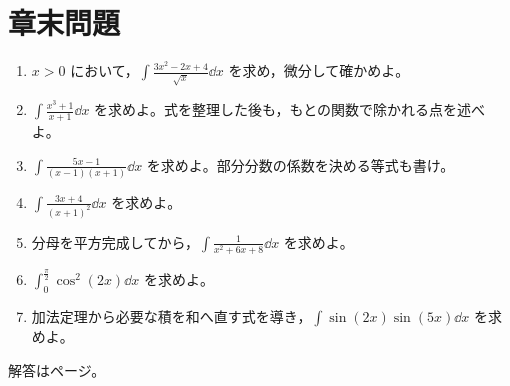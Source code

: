 \section*{章末問題}
\begin{enumerate}[label=\textbf{\thechapter.\arabic*},leftmargin=*]
 \item\label{問:基本べき} $x>0$ において，$\int\frac{3x^2-2x+4}{\sqrt{x}}\dd x$ を求め，微分して確かめよ。
 \item\label{問:基本割算} $\int\frac{x^3+1}{x+1}\dd x$ を求めよ。式を整理した後も，もとの関数で除かれる点を述べよ。
 \item\label{問:基本部分分数} $\int\frac{5x-1}{(x-1)(x+1)}\dd x$ を求めよ。部分分数の係数を決める等式も書け。
 \item\label{問:基本重因子} $\int\frac{3x+4}{(x+1)^2}\dd x$ を求めよ。
 \item\label{問:基本平方完成} 分母を平方完成してから，$\int\frac1{x^2+6x+8}\dd x$ を求めよ。
 \item\label{問:基本三角二乗} $\int_0^{\frac\pi2}\cos^2(2x)\dd x$ を求めよ。
 \item\label{問:基本三角積} 加法定理から必要な積を和へ直す式を導き，$\int\sin(2x)\sin(5x)\dd x$ を求めよ。
\end{enumerate}

\smallskip\noindent 解答は\pageref{解答:第4章}ページ。
